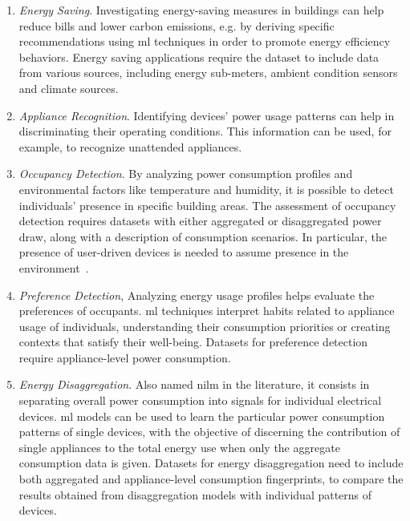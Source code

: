 \newpage

\begin{enumerate}[label={\textit{A\arabic*.}}, leftmargin=3.5em]
    \item \textit{Energy Saving}. Investigating energy-saving measures in buildings can help reduce bills and lower carbon emissions, e.g. by deriving specific recommendations using \acrfull{ml} techniques in order to promote energy efficiency behaviors. Energy saving applications require the dataset to include data from various sources, including energy sub-meters, ambient condition sensors and climate sources.

    \item \textit{Appliance Recognition}. Identifying devices' power usage patterns can help in discriminating their operating conditions. This information can be used, for example, to recognize unattended appliances. 
    
    \item \textit{Occupancy Detection}. By analyzing power consumption profiles and environmental factors like temperature and humidity, it is possible to detect individuals' presence in specific building areas. The assessment of occupancy detection requires datasets with either aggregated or disaggregated power draw, along with a description of consumption scenarios. In particular, the presence of user-driven devices is needed to assume presence in the environment~\parencite{monacchi_greend_2014}.
    
    \item \textit{Preference Detection}, Analyzing energy usage profiles helps evaluate the preferences of occupants. \acrshort{ml} techniques interpret habits related to appliance usage of individuals, understanding their consumption priorities or creating contexts that satisfy their well-being. Datasets for preference detection require appliance-level power consumption.
    
    \item \textit{Energy Disaggregation}. Also named \acrfull{nilm} in the literature, it consists in separating overall power consumption into signals for individual electrical devices. \acrshort{ml} models can be used to learn the particular power consumption patterns of single devices, with the objective of discerning the contribution of single appliances to the total energy use when only the aggregate consumption data is given. Datasets for energy disaggregation need to include both aggregated and appliance-level consumption fingerprints, to compare the results obtained from disaggregation models with individual patterns of devices.
    

\end{enumerate}

